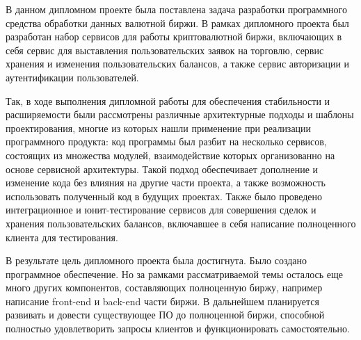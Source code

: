 
В данном дипломном проекте была поставлена задача разработки программного средства обработки данных валютной биржи. В рамках дипломного проекта был разработан набор сервисов для работы криптовалютной биржи, включающих в себя сервис для выставления пользовательских заявок на торговлю, сервис хранения и изменения пользовательских балансов, а также сервис авторизации и аутентификации пользователей.

Так, в ходе выполнения дипломной работы для обеспечения стабильности и расширяемости были рассмотрены различные архитектурные подходы и шаблоны проектирования, многие из которых нашли применение при реализации программного продукта: код программы был разбит на несколько сервисов, состоящих из множества модулей, взаимодействие которых организованно на основе сервисной архитектуры. Такой подход обеспечивает дополнение и изменение кода без влияния на другие части проекта, а также возможность использовать полученный код в будущих проектах. Также было проведено интеграционное и юнит-тестирование сервисов для совершения сделок и хранения пользовательских балансов, включавшее в себя написание полноценного клиента для тестирования.

В результате цель дипломного проекта была достигнута. Было создано программное обеспечение. Но за рамками рассматриваемой темы осталось еще много других компонентов, составляющих полноценную биржу, например написание front-end и back-end части биржи. В дальнейшем планируется развивать и довести существующее ПО до полноценной биржи, способной полностью удовлетворить запросы клиентов и функционировать самостоятельно.
